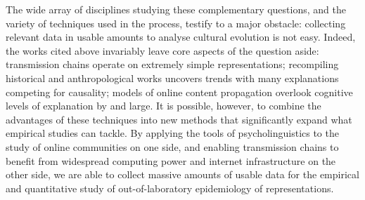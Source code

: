 \documentclass[english,]{article}
\begin{document}
The wide array of disciplines studying these complementary questions, and the variety of techniques used in the process, testify to a major obstacle:
collecting relevant data in usable amounts to analyse cultural evolution is not easy.
Indeed, the works cited above invariably leave core aspects of the question aside:
transmission chains operate on extremely simple representations;
recompiling historical and anthropological works uncovers trends with many explanations competing for causality;
models of online content propagation overlook cognitive levels of explanation by and large.
It is possible, however, to combine the advantages of these techniques into new methods that significantly expand what empirical studies can tackle.
By applying the tools of psycholinguistics to the study of online communities on one side, and enabling transmission chains to benefit from widespread computing power and internet infrastructure on the other side, we are able to collect massive amounts of usable data for the empirical and quantitative study of out-of-laboratory epidemiology of representations.
\end{document}
